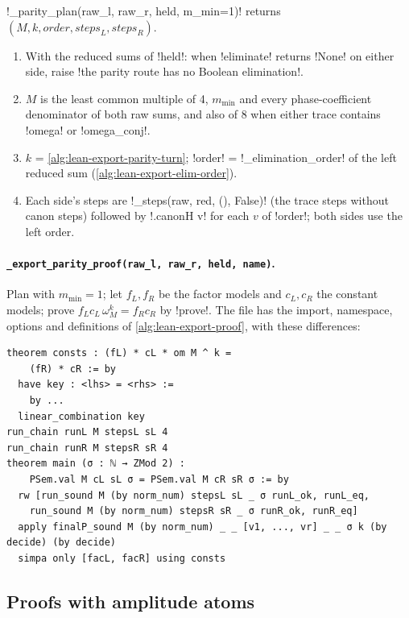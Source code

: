 {{{\begin{algorithm}\label{alg:lean-export-parity-plan}
\lexpy!_parity_plan(raw_l, raw_r, held, m_min=1)! returns
$(M, k, \mathit{order}, \mathit{steps}_L, \mathit{steps}_R)$.
\begin{enumerate}
\item With the reduced sums of \lexcode!held!: when \lexpy!eliminate! returns \lexpy!None! on either side,
raise \lexcode!the parity route has no Boolean elimination!.
\item $M$ is the least common multiple of 4, $m_{\min}$ and every phase-coefficient
denominator of both raw sums, and also of 8 when either trace contains \lexcode!omega! or
\lexcode!omega_conj!.
\item $k$ = \cref{alg:lean-export-parity-turn}; \lexcode!order! = \lexpy!_elimination_order! of the
left reduced sum (\cref{alg:lean-export-elim-order}).
\item Each side's steps are \lexpy!_steps(raw, red, (), False)! (the trace steps without canon
steps) followed by \lexlean!.canonH v! for each $v$ of \lexcode!order!; both sides use the left
order.
\end{enumerate}
\end{algorithm}

\paragraph{\texttt{\_export\_parity\_proof(raw\_l, raw\_r, held, name)}.} Plan with
$m_{\min}=1$; let $f_L, f_R$ be the factor models and $c_L, c_R$ the constant models; prove
$f_L c_L\,\omega_M^{k} = f_R c_R$ by \lexpy!prove!. The file has the import, namespace, options and
definitions of \cref{alg:lean-export-proof}, with these differences:
\begin{lstlisting}[style=lexlean]
theorem consts : (fL) * cL * om M ^ k =
    (fR) * cR := by
  have key : <lhs> = <rhs> :=
    by ...
  linear_combination key
run_chain runL M stepsL sL 4
run_chain runR M stepsR sR 4
theorem main (σ : ℕ → ZMod 2) :
    PSem.val M cL sL σ = PSem.val M cR sR σ := by
  rw [run_sound M (by norm_num) stepsL sL _ σ runL_ok, runL_eq,
    run_sound M (by norm_num) stepsR sR _ σ runR_ok, runR_eq]
  apply finalP_sound M (by norm_num) _ _ [v1, ..., vr] _ _ σ k (by decide) (by decide)
  simpa only [facL, facR] using consts
\end{lstlisting}

\subsection{Proofs with amplitude atoms}\label{sec:lean-export-amp-proof}

}}}
